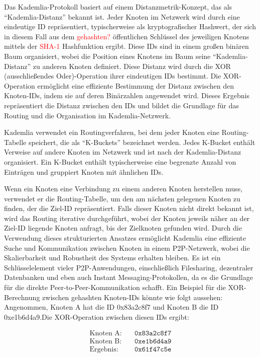 Das Kademlia-Protokoll basiert auf einem Distanzmetrik-Konzept, das als \\
\enquote{Kademlia-Distanz} bekannt ist. Jeder Knoten im Netzwerk wird durch eine eindeutige 
ID repräsentiert, typischerweise als kryptografischer Hashwert, der sich in diesem Fall 
aus dem \textcolor{red}{gehashten?} öffentlichen Schlüssel
des jeweiligen Knotens mittels der \textcolor{red}{SHA-1} Hashfunktion ergibt. Diese IDs 
sind in einem großen binären Baum organisiert, wobei die Position eines Knotens im Baum seine 
\enquote{Kademlia-Distanz} zu anderen Knoten definiert. Diese Distanz wird durch die XOR 
(ausschließendes Oder)-Operation ihrer eindeutigen IDs bestimmt. Die XOR-Operation 
ermöglicht eine effiziente Bestimmung der Distanz zwischen den Knoten-IDs, indem 
sie auf deren Binärzahlen angewendet wird. Dieses Ergebnis repräsentiert die 
Distanz zwischen den IDs und bildet die Grundlage für das Routing und die 
Organisation im Kademlia-Netzwerk.

Kademlia verwendet ein Routingverfahren, bei dem jeder Knoten eine Routing-\\
Tabelle 
speichert, die als \enquote{K-Buckets} bezeichnet werden. Jedes K-Bucket enthält Verweise 
auf andere Knoten im Netzwerk und ist nach der Kademlia-Distanz organisiert. Ein 
K-Bucket enthält typischerweise eine begrenzte Anzahl von Einträgen und gruppiert 
Knoten mit ähnlichen IDs.

Wenn ein Knoten eine Verbindung zu einem anderen Knoten herstellen muss, verwendet 
er die Routing-Tabelle, um den am nächsten gelegenen Knoten zu finden, der die 
Ziel-ID repräsentiert. Falls dieser Knoten nicht direkt bekannt ist, wird das 
Routing iterative durchgeführt, wobei der Knoten jeweils näher an der Ziel-ID 
liegende Knoten anfragt, bis der Zielknoten gefunden wird. Durch die Verwendung 
dieses strukturierten Ansatzes ermöglicht Kademlia eine effiziente Suche und 
Kommunikation zwischen Knoten in einem P2P-Netzwerk, wobei die Skalierbarkeit 
und Robustheit des Systems erhalten bleiben. Es ist ein Schlüsselelement vieler 
P2P-Anwendungen, einschließlich Filesharing, dezentraler Datenbanken und eben auch 
Instant Messaging-Protokollen, da es die Grundlage für die direkte 
Peer-to-Peer-Kommunikation schafft.
Ein Beispiel für die XOR-Berechnung zwischen gehashten Knoten-IDs könnte 
wie folgt aussehen:
Angenommen, Knoten A hat die ID 0x83a2c8f7 und Knoten B die ID 0xe1b6d4a9.Die XOR-Operation 
zwischen diesen IDs ergibt:

\begin{equation}
    \begin{aligned}
        \text{Knoten A:} & \quad \texttt{0x83a2c8f7} \\
        \text{Knoten B:} & \quad \texttt{0xe1b6d4a9} \\
        \text{Ergebnis:} & \quad \texttt{0x61f47c5e}
    \end{aligned}
\end{equation}

